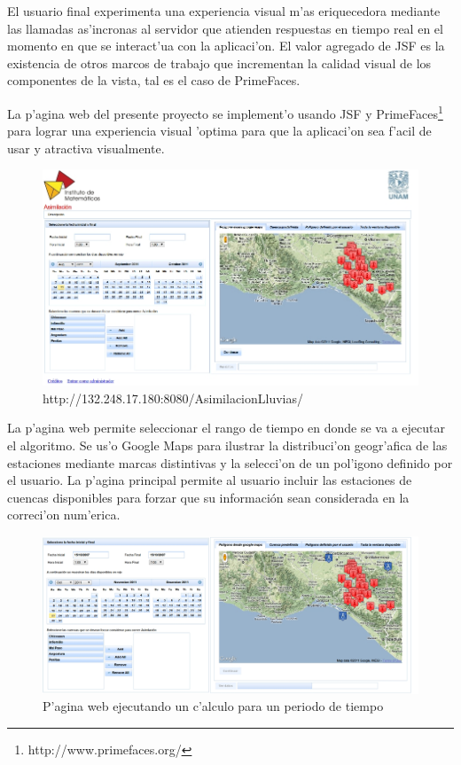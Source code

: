El usuario final experimenta una experiencia visual m'as eriquecedora mediante las llamadas as'incronas al servidor que atienden
respuestas en tiempo real en el momento en que se interact'ua con la aplicaci'on. El valor agregado de JSF es la existencia de otros
marcos de trabajo que incrementan la calidad visual de los componentes de la vista, tal es el caso de PrimeFaces.

La p'agina web del presente proyecto se implement'o usando JSF 
y PrimeFaces\footnote{http://www.primefaces.org/} para lograr una experiencia visual 'optima
para que la aplicaci'on sea f'acil de usar y atractiva visualmente.

\begin{figure}[!ht]
 \centering
 \includegraphics[width=150mm]{./imagenes/pagWeb.jpg}
 \caption{http://132.248.17.180:8080/AsimilacionLluvias/}
\end{figure}


La p'agina web permite seleccionar el rango de tiempo en donde se va a ejecutar el algoritmo. Se us'o Google Maps
para ilustrar la distribuci'on geogr'afica de las estaciones mediante marcas distintivas y la selecci'on de un pol'igono 
definido por el usuario.
La p'agina principal permite al usuario incluir las estaciones de cuencas disponibles para forzar que su informaci\'on 
sean considerada en la correci'on num'erica. 


\begin{figure}[ht!]
 \centering
 \includegraphics[width=150mm]{./imagenes/ejemploPagina1.jpg}
 \caption{P'agina web ejecutando un c'alculo para un periodo de tiempo}
\end{figure}

